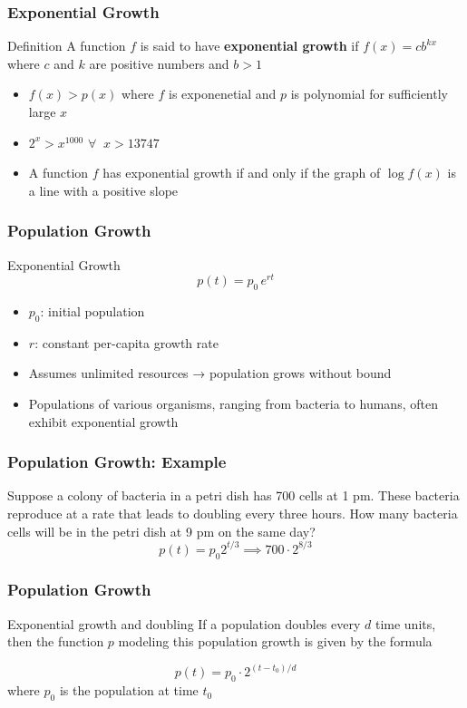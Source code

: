 \documentclass{beamer}
\begin{document}
    \begin{frame}
      \frametitle{Exponential Growth}
      \begin{block}{Definition}
      A function \(f\) is said to have \textbf{exponential growth} if \(f(x) = cb^{kx} \) where 
      \(c\) and \(k\) are positive numbers and \(b > 1\)
      \end{block}
      \begin{itemize}
        \item \(f(x) > p(x)\)  where \(f\) is exponenetial and \(p\) is polynomial for sufficiently large \(x\) 
        \item \(2^{x} > x^{1000} \)  \(\forall \;\; x > 13747 \)  
        \item A function \(f\) has exponential growth if and only if the graph of \(\log f(x)\) is a line with a positive slope
      \end{itemize}


    \end{frame}
    

    \begin{frame}
      \frametitle{Population Growth}
        \begin{block}{Exponential Growth}
          \[
            p(t) = p_0\,e^{rt}
          \]
          \begin{itemize}
            \item \(p_0\): initial population  
            \item \(r\): constant per-capita growth rate  
            \item Assumes unlimited resources → population grows without bound  
            \item Populations of various organisms, ranging from bacteria to humans, often exhibit exponential growth
          \end{itemize}
        \end{block}
    \end{frame}
    \begin{frame}
      \frametitle{Population Growth: Example}
      Suppose a colony of bacteria in a petri dish has 700 cells at 1 pm. These bacteria
      reproduce at a rate that leads to doubling every three hours. How many bacteria
      cells will be in the petri dish at 9 pm on the same day?
      \pause 
      \[
       p(t) = p_{0}2^{t/3} \implies 700 \cdot 2^{8/3} 
       \]
    \end{frame}


    \begin{frame} 
      \frametitle{Population Growth}
      \begin{block}{Exponential growth and doubling}
        If a population doubles every \( d \) time units, then the function \( p \) modeling this population growth is given by the formula

        \[
          p(t) = p_{0} \cdot 2^{(t-t_{0})/d}
        \]
        where \(p_{0}\) is the population at time \(t_{0}\)
        \end{block}    
    \end{frame}
\end{document}
